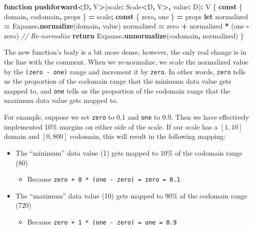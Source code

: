 \documentclass[
]{book}
\newenvironment{Shaded}{\begin{snugshade}}{\end{snugshade}}
\newcommand{\CommentTok}[1]{\textcolor[rgb]{0.56,0.35,0.01}{\textit{#1}}}
\newcommand{\ControlFlowTok}[1]{\textcolor[rgb]{0.13,0.29,0.53}{\textbf{#1}}}
\newcommand{\FunctionTok}[1]{\textcolor[rgb]{0.13,0.29,0.53}{\textbf{#1}}}
\newcommand{\KeywordTok}[1]{\textcolor[rgb]{0.13,0.29,0.53}{\textbf{#1}}}
\newcommand{\NormalTok}[1]{#1}
\newcommand{\OperatorTok}[1]{\textcolor[rgb]{0.81,0.36,0.00}{\textbf{#1}}}
\providecommand{\tightlist}{%
  \setlength{\itemsep}{0pt}\setlength{\parskip}{0pt}}
\theoremstyle{definition}
\theoremstyle{definition}
\theoremstyle{definition}
\theoremstyle{definition}
\theoremstyle{remark}
\begin{document}
\begin{Shaded}
\begin{Highlighting}[]
\KeywordTok{function} \FunctionTok{pushforward}\OperatorTok{\textless{}}\NormalTok{D}\OperatorTok{,}\NormalTok{ V}\OperatorTok{\textgreater{}}\NormalTok{(scale}\OperatorTok{:}\NormalTok{ Scale}\OperatorTok{\textless{}}\NormalTok{D}\OperatorTok{,}\NormalTok{ V}\OperatorTok{\textgreater{},}\NormalTok{ value}\OperatorTok{:}\NormalTok{ D)}\OperatorTok{:}\NormalTok{ V \{}
  \KeywordTok{const}\NormalTok{ \{ domain}\OperatorTok{,}\NormalTok{ codomain}\OperatorTok{,}\NormalTok{ props \} }\OperatorTok{=}\NormalTok{ scale}\OperatorTok{;}
  \KeywordTok{const}\NormalTok{ \{ zero}\OperatorTok{,}\NormalTok{ one \} }\OperatorTok{=}\NormalTok{ props}
  \KeywordTok{let}\NormalTok{ normalized }\OperatorTok{=}\NormalTok{ Expanse}\OperatorTok{.}\FunctionTok{normalize}\NormalTok{(domain}\OperatorTok{,}\NormalTok{ value)}
\NormalTok{  normalized }\OperatorTok{=}\NormalTok{ zero }\OperatorTok{+}\NormalTok{ normalized }\OperatorTok{*}\NormalTok{ (one }\OperatorTok{{-}}\NormalTok{ zero) }\CommentTok{// Re{-}normalize}
  \ControlFlowTok{return}\NormalTok{ Expanse}\OperatorTok{.}\FunctionTok{unnormalize}\NormalTok{(codomain}\OperatorTok{,}\NormalTok{ normalized)}
\NormalTok{\}}
\end{Highlighting}
\end{Shaded}

The new function's body is a bit more dense, however, the only real change is in the line with the comment. When we re-normalize, we scale the normalized value by the \texttt{(zero\ -\ one)} range and increment it by \texttt{zero}. In other words, \texttt{zero} tells us the proportion of the codomain range that the minimum data value gets mapped to, and \texttt{one} tells us the proportion of the codomain range that the maximum data value gets mapped to.

For example, suppose we set \texttt{zero} to 0.1 and \texttt{one} to 0.9. Then we have effectively implemented 10\% margins on either side of the scale. If our scale has a \([1, 10]\) domain and \([0, 800]\) codomain, this will result in the following mapping:

\begin{itemize}
\tightlist
\item
  The ``minimum'' data value (1) gets mapped to 10\% of the codomain range (80)

  \begin{itemize}
  \tightlist
  \item
    Because \texttt{zero\ +\ 0\ *\ (one\ -\ zero)\ =\ zero\ =\ 0.1}
  \end{itemize}
\item
  The ``maximum'' data value (10) gets mapped to 90\% of the codomain range (720)

  \begin{itemize}
  \tightlist
  \item
    Because \texttt{zero\ +\ 1\ *\ (one\ -\ zero)\ =\ one\ =\ 0.9}
  \end{itemize}
\end{itemize}
\end{document}
